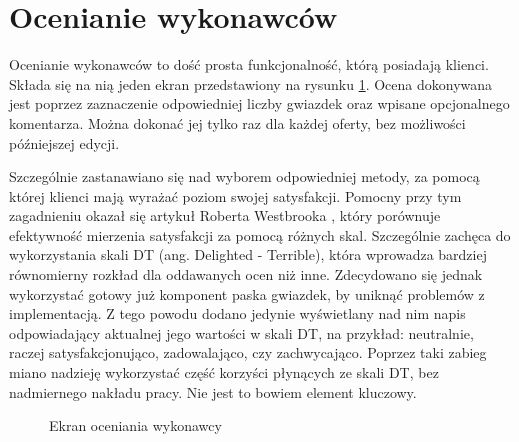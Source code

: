 \section{Ocenianie wykonawców}

Ocenianie wykonawców to dość prosta funkcjonalność, którą posiadają klienci. Składa się na nią jeden ekran przedstawiony na rysunku \ref{fig:rate}. Ocena dokonywana jest poprzez zaznaczenie odpowiedniej liczby gwiazdek oraz wpisane opcjonalnego komentarza. Można dokonać jej tylko raz dla każdej oferty, bez możliwości późniejszej edycji.

Szczególnie zastanawiano się nad wyborem odpowiedniej metody, za pomocą której klienci mają wyrażać poziom swojej satysfakcji. Pomocny przy tym zagadnieniu okazał się artykuł Roberta Westbrooka \cite{rating-scale}, który porównuje efektywność mierzenia satysfakcji za pomocą różnych skal. Szczególnie zachęca do wykorzystania skali DT (ang. Delighted - Terrible), która wprowadza bardziej równomierny rozkład dla oddawanych ocen niż inne. Zdecydowano się jednak wykorzystać gotowy już komponent paska gwiazdek, by uniknąć problemów z implementacją. Z tego powodu dodano jedynie wyświetlany nad nim napis odpowiadający aktualnej jego wartości w skali DT, na przykład: neutralnie, raczej satysfakcjonująco, zadowalająco, czy zachwycająco. Poprzez taki zabieg miano nadzieję wykorzystać część korzyści płynących ze skali DT, bez nadmiernego nakładu pracy. Nie jest to bowiem element kluczowy.

\begin{figure}[ht]
  \centering
  \caption{Ekran oceniania wykonawcy}
  \label{fig:rate}
\end{figure}

